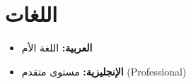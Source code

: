 \documentclass[10pt,a4paper]{article}
\begin{document}
\section*{اللغات}
\begin{itemize}[leftmargin=*]
    \item \textbf{العربية:} اللغة الأم
    \item \textbf{الإنجليزية:} مستوى متقدم (Professional)
\end{itemize}
\end{document}
